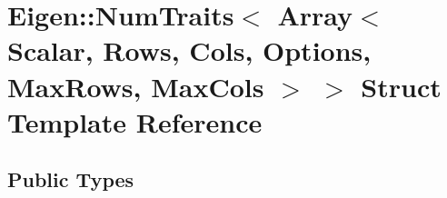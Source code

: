 \hypertarget{struct_eigen_1_1_num_traits_3_01_array_3_01_scalar_00_01_rows_00_01_cols_00_01_options_00_01_max_rows_00_01_max_cols_01_4_01_4}{}\section{Eigen\+:\+:Num\+Traits$<$ Array$<$ Scalar, Rows, Cols, Options, Max\+Rows, Max\+Cols $>$ $>$ Struct Template Reference}
\label{struct_eigen_1_1_num_traits_3_01_array_3_01_scalar_00_01_rows_00_01_cols_00_01_options_00_01_max_rows_00_01_max_cols_01_4_01_4}
\subsection*{Public Types}
